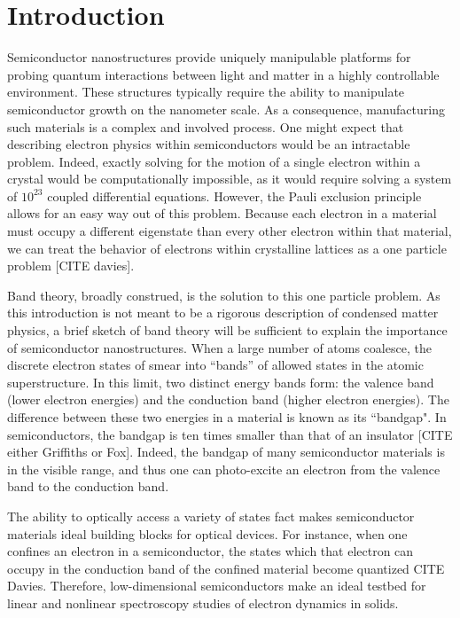\chapter{Introduction}


\indent Semiconductor nanostructures provide uniquely manipulable platforms for probing quantum interactions between light and matter in a highly controllable environment. These structures typically require the ability to manipulate semiconductor growth on the nanometer scale. As a consequence, manufacturing such materials is a complex and involved process. One might expect that describing electron physics within semiconductors would be an intractable problem. Indeed, exactly solving for the motion of a single electron within a crystal would be computationally impossible, as it would require solving a system of $10^23$ coupled differential equations.  However, the Pauli exclusion principle allows for an easy way out of this problem. Because each electron in a material must occupy a different eigenstate than every other electron within that material, we can treat the behavior of electrons within crystalline lattices as a one particle problem [CITE davies]. 

\indent Band theory, broadly construed, is the solution to this one particle problem. As this introduction is not meant to be a rigorous description of condensed matter physics, a brief sketch of band theory will be sufficient to explain the importance of semiconductor nanostructures. When a large number of atoms coalesce, the discrete electron states of smear into ``bands'' of allowed states in the atomic superstructure. In this limit, two distinct energy bands form: the valence band (lower electron energies) and the conduction band (higher electron energies). The difference between these two energies in a material is known as its ``bandgap". In semiconductors, the bandgap is ten times smaller than that of an insulator [CITE either Griffiths or Fox]. Indeed, the bandgap of many semiconductor materials is in the visible range, and thus one can photo-excite an electron from the valence band to the conduction band.

\indent The ability to optically access a variety of states fact makes semiconductor materials ideal building blocks for optical devices. For instance, when one confines an electron in a semiconductor, the states which that electron can occupy in the conduction band of the confined material become quantized CITE Davies. Therefore, low-dimensional semiconductors make an ideal testbed for linear and nonlinear spectroscopy studies of electron dynamics in solids.

